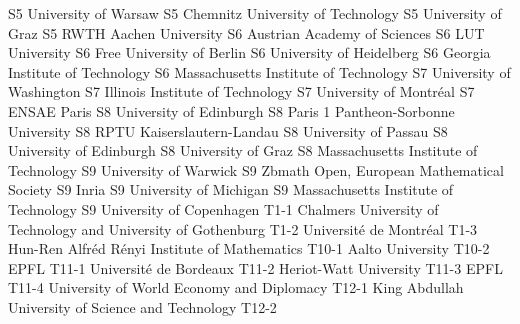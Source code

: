 \begin{multicols}{2}
{S5}
{}
{University of Warsaw}
{S5}
{}
{Chemnitz University of Technology}
{S5}
{}
{University of Graz}
{S5}
{}
{RWTH Aachen University}
{S6}
{}
{Austrian Academy of Sciences}
{S6}
{}
{LUT University}
{S6}
{}
{Free University of Berlin}
{S6}
{}
{University of Heidelberg}
{S6}
{}
{Georgia Institute of Technology}
{S6}
{}
{Massachusetts Institute of Technology}
{S7}
{}
{University of Washington}
{S7}
{}
{Illinois Institute of Technology}
{S7}
{}
{University of Montréal}
{S7}
{}
{ENSAE Paris}
{S8}
{}
{University of Edinburgh}
{S8}
{}
{Paris 1 Pantheon-Sorbonne University}
{S8}
{}
{RPTU Kaiserslautern-Landau}
{S8}
{}
{University of Passau}
{S8}
{}
{University of Edinburgh}
{S8}
{}
{University of Graz}
{S8}
{}
{Massachusetts Institute of Technology}
{S9}
{}
{University of Warwick}
{S9}
{}
{Zbmath Open, European Mathematical Society}
{S9}
{}
{Inria}
{S9}
{}
{University of Michigan}
{S9}
{}
{Massachusetts Institute of Technology}
{S9}
{}
{University of Copenhagen}
{T1-1}
{}
{Chalmers University of Technology and University of Gothenburg}
{T1-2}
{}
{Université de Montréal}
{T1-3}
{}
{Hun-Ren Alfréd Rényi Institute of Mathematics}
{T10-1}
{}
{Aalto University}
{T10-2}
{}
{EPFL}
{T11-1}
{}
{Université de Bordeaux}
{T11-2}
{}
{Heriot-Watt University}
{T11-3}
{}
{EPFL}
{T11-4}
{}
{University of World Economy and Diplomacy}
{T12-1}
{}
{King Abdullah University of Science and Technology}
{T12-2}
{}

\end{multicols}
